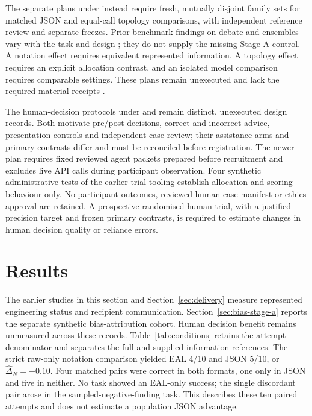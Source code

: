 \documentclass[preprint,12pt]{elsarticle}
\begin{document}
The separate plans under  instead require fresh, mutually disjoint family sets for matched JSON and equal-call topology comparisons, with independent reference review and separate freezes. Prior benchmark findings on debate and ensembles vary with the task and design \citep{du2024,smit2024,ma2025}; they do not supply the missing Stage A control. A notation effect requires equivalent represented information. A topology effect requires an explicit allocation contrast, and an isolated model comparison requires comparable settings. These plans remain unexecuted and lack the required material receipts \citep{earlBiasNext}.

The human-decision protocols under  and  remain distinct, unexecuted design records. Both motivate pre/post decisions, correct and incorrect advice, presentation controls and independent case review; their assistance arms and primary contrasts differ and must be reconciled before registration. The newer plan requires fixed reviewed agent packets prepared before recruitment and excludes live API calls during participant observation. Four synthetic administrative tests of the earlier trial tooling establish allocation and scoring behaviour only. No participant outcomes, reviewed human case manifest or ethics approval are retained. A prospective randomised human trial, with a justified precision target and frozen primary contrasts, is required to estimate changes in human decision quality or reliance errors.


\section{Results}\label{sec:results}
The earlier studies in this section and Section~\ref{sec:delivery} measure represented engineering status and recipient communication. Section~\ref{sec:bias-stage-a} reports the separate synthetic bias-attribution cohort. Human decision benefit remains unmeasured across these records.
Table~\ref{tab:conditions} retains the attempt denominator and separates the full and supplied-information references. The strict raw-only notation comparison yielded EAL 4/10 and JSON 5/10, or \(\widehat{\Delta}_{N}=-0.10\). Four matched pairs were correct in both formats, one only in JSON and five in neither. No task showed an EAL-only success; the single discordant pair arose in the sampled-negative-finding task. This describes these ten paired attempts and does not estimate a population JSON advantage.
\end{document}
